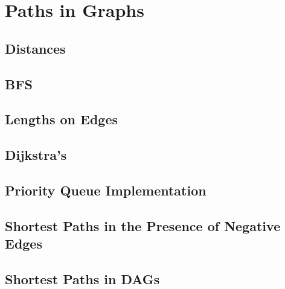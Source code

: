 \section{Paths in Graphs}

\subsection{Distances}

\subsection{BFS}

\subsection{Lengths on Edges}

\subsection{Dijkstra's}

\subsection{Priority Queue Implementation}

\subsection{Shortest Paths in the Presence of Negative Edges}

\subsection{Shortest Paths in DAGs}
